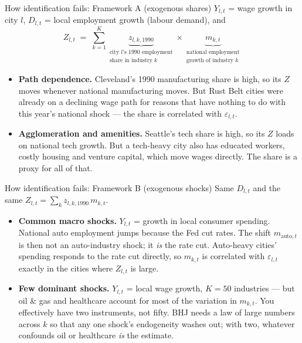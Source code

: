 \documentclass[
  11pt,
  ignorenonframetext,
  aspectratio=169,
]{beamer}
\providecommand{\tightlist}{%
  \setlength{\itemsep}{0pt}\setlength{\parskip}{0pt}}
\begin{document}
\begin{frame}{How identification fails: Framework A (exogenous shares)}
\protect{}\label{how-identification-fails-framework-a-exogenous-shares}
\(Y_{l,t}\) = wage growth in city \(l\), \(D_{l,t}\) = local employment
growth (labour demand), and \[
Z_{l,t} \;=\; \sum_{k=1}^{K} \underbrace{z_{l,k,1990}}_{\substack{\text{city } l\text{'s 1990 employment}\\ \text{share in industry } k}} \times \underbrace{m_{k,t}}_{\substack{\text{national employment}\\ \text{growth of industry } k}}
\]

\begin{itemize}
\tightlist
\item
  \textbf{Path dependence.} Cleveland's 1990 manufacturing share is
  high, so its \(Z\) moves whenever national manufacturing moves. But
  Rust Belt cities were already on a declining wage path for reasons
  that have nothing to do with this year's national shock --- the share
  is correlated with \(\varepsilon_{l,t}\).
\item
  \textbf{Agglomeration and amenities.} Seattle's tech share is high, so
  its \(Z\) loads on national tech growth. But a tech-heavy city also
  has educated workers, costly housing and venture capital, which move
  wages directly. The share is a proxy for all of that.
\end{itemize}
\end{frame}

\begin{frame}{How identification fails: Framework B (exogenous shocks)}
\protect{}\label{how-identification-fails-framework-b-exogenous-shocks}
Same \(D_{l,t}\) and the same
\(Z_{l,t} = \sum_k z_{l,k,1990}\, m_{k,t}\).

\begin{itemize}
\tightlist
\item
  \textbf{Common macro shocks.} \(Y_{l,t}\) = growth in local consumer
  spending. National auto employment jumps because the Fed cut rates.
  The shift \(m_{\text{auto},t}\) is then not an auto-industry shock; it
  \emph{is} the rate cut. Auto-heavy cities' spending responds to the
  rate cut directly, so \(m_{k,t}\) is correlated with
  \(\varepsilon_{l,t}\) exactly in the cities where \(Z_{l,t}\) is
  large.
\item
  \textbf{Few dominant shocks.} \(Y_{l,t}\) = local wage growth,
  \(K = 50\) industries --- but oil \& gas and healthcare account for
  most of the variation in \(m_{k,t}\). You effectively have two
  instruments, not fifty. BHJ needs a law of large numbers across \(k\)
  so that any one shock's endogeneity washes out; with two, whatever
  confounds oil or healthcare \emph{is} the estimate.
\end{itemize}
\end{frame}
\end{document}
